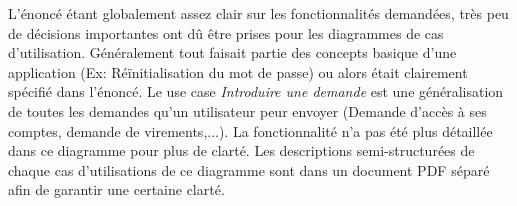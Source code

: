 L'énoncé étant globalement assez clair sur les fonctionnalités demandées, 
très peu de décisions importantes ont dû être prises pour les diagrammes de cas d'utilisation.
Généralement tout faisait partie des concepts basique d'une application (Ex: Réïnitialisation du mot de passe) ou alors était clairement spécifié dans l'énoncé.
Le use case \textit{Introduire une demande} est une généralisation de toutes les demandes qu'un utilisateur peur envoyer (Demande d'accès à ses comptes, demande de virements,...). 
La fonctionnalité n'a pas été plus détaillée dans ce diagramme pour plus de clarté.
Les descriptions semi-structurées de chaque cas d'utilisations de ce diagramme sont dans un document PDF séparé afin de garantir une certaine clarté. 
